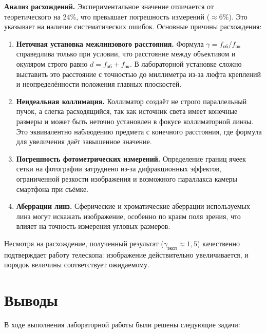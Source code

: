 \documentclass[a4paper]{article}
\begin{document}
\textbf{Анализ расхождений.} Экспериментальное значение отличается от теоретического на 24\%, что превышает погрешность измерений ($\approx 6\%$). Это указывает на наличие систематических ошибок. Основные причины расхождения:

\begin{enumerate}
    \item \textbf{Неточная установка межлинзового расстояния.} Формула $\gamma = f_\text{об}/f_\text{ок}$ справедлива только при условии, что расстояние между объективом и окуляром строго равно $d = f_\text{об} + f_\text{ок}$. В лабораторной установке сложно выставить это расстояние с точностью до миллиметра из-за люфта креплений и неопределённости положения главных плоскостей.
    
    \item \textbf{Неидеальная коллимация.} Коллиматор создаёт не строго параллельный пучок, а слегка расходящийся, так как источник света имеет конечные размеры и может быть неточно установлен в фокусе коллиматорной линзы. Это эквивалентно наблюдению предмета с конечного расстояния, где формула для увеличения даёт завышенное значение.
    
    \item \textbf{Погрешность фотометрических измерений.} Определение границ ячеек сетки на фотографии затруднено из-за дифракционных эффектов, ограниченной резкости изображения и возможного параллакса камеры смартфона при съёмке.
    
    \item \textbf{Аберрации линз.} Сферические и хроматические аберрации используемых линз могут искажать изображение, особенно по краям поля зрения, что влияет на точность измерения угловых размеров.
\end{enumerate}

Несмотря на расхождение, полученный результат ($\gamma_\text{эксп} \approx 1{,}5$) качественно подтверждает работу телескопа: изображение действительно увеличивается, и порядок величины соответствует ожидаемому.

\section{Выводы}

В ходе выполнения лабораторной работы были решены следующие задачи:
\end{document}
